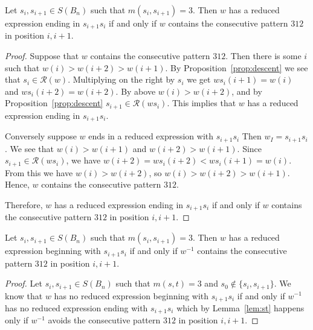 \begin{lemma}\label{lem:st}
Let $s_i,s_{i+1} \in S(B_n)$ such that $m(s_i,s_{i+1})=3$. Then $w$ has a reduced expression ending in $s_{i+1}s_i$ if and only if $w$ contains the consecutive pattern $312$ in position $i, i+1$.
\begin{proof}
	Suppose that $w$ contains the consecutive pattern $312$.  Then there is some $i$ such that $w(i)>w(i+2)>w(i+1)$. By Proposition~\ref{prop:descent} we see that $s_i \in \mathcal{R}(w)$. Multiplying on the right by $s_i$ we get $ws_i(i+1)=w(i)$ and $ws_i(i+2)=w(i+2)$. By above $w(i)>w(i+2)$, and by Proposition~\ref{prop:descent} $s_{i+1} \in \mathcal{R}(ws_i)$. This implies that $w$ has a reduced expression ending in $s_{i+1}s_i$. 
	
	Conversely suppose $w$ ends in a reduced expression with $s_{i+1}s_i$ Then $w_I=s_{i+1}s_i$. We see that $w(i)>w(i+1)$ and $w(i+2)>w(i+1)$. Since $s_{i+1} \in \mathcal{R}(ws_i)$, we have $w(i+2)=ws_i(i+2)<ws_i(i+1)=w(i)$. From this we have $w(i)>w(i+2)$, so $w(i)>w(i+2)>w(i+1)$. Hence, $w$ contains the consecutive pattern $312$. 
	
	Therefore, $w$ has a reduced expression ending in $s_{i+1}s_i$ if and only if $w$ contains the consecutive pattern $312$ in position $i, i+1$.
\end{proof}
\end{lemma}

\begin{corollary}\label{lem:endswithts}
	Let $s_i,s_{i+1} \in S(B_n)$ such that $m(s_i,s_{i+1})=3$. Then $w$ has a reduced expression beginning with $s_{i+1}s_i$ if and only if $w^{-1}$ contains the consecutive pattern $312$ in position $i, i+1$.
	\begin{proof}
		Let $s_i,s_{i+1} \in S(B_n)$ such that $m(s,t)=3$ and $s_0 \notin\{s_i,s_{i+1}\}$. We know that $w$ has no reduced expression beginning with $s_{i+1}s_i$ if and only if $w^{-1}$ has no reduced expression ending with $s_{i+1}s_i$ which by Lemma~\ref{lem:st} happens only if $w^{-1}$ avoids the consecutive pattern $312$ in position $i, i+1$.
		\end{proof}
\end{corollary}

